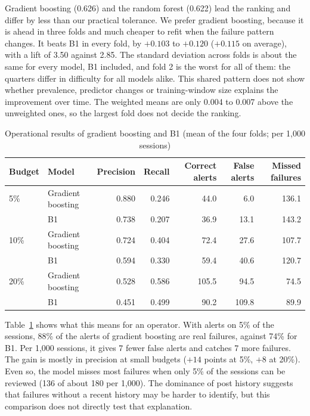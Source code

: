 \documentclass[12pt,a4paper,openany]{report}
\begin{document}
Gradient boosting (0.626) and the random forest (0.622) lead the ranking and differ by less than our practical tolerance. We prefer gradient boosting, because it
is ahead in three folds and much cheaper to refit when the failure pattern changes. It beats B1 in every fold, by
$+0.103$ to $+0.120$ ($+0.115$ on average), with a lift of 3.50 against 2.85. The standard deviation across folds is
about the same for every model, B1 included, and fold 2 is the worst for all of them: the quarters differ in
difficulty for all models alike. This shared pattern does not show whether prevalence, predictor changes or
training-window size explains the improvement over time. The weighted means are only 0.004 to 0.007 above the unweighted ones, so the
largest fold does not decide the ranking.

\begin{table}[!htb]
  \centering\small
  \caption{Operational results of gradient boosting and B1 (mean of the four folds; per 1,000 sessions)}
  \label{tab:alerts}
  \setlength{\tabcolsep}{4pt}
  \begin{tabular*}{\textwidth}{@{\extracolsep{\fill}}llrrrrr}
    \toprule
    Budget & Model & Precision & Recall & Correct alerts & False alerts & Missed failures \\
    \midrule
    5\%  & Gradient boosting & 0.880 & 0.246 & 44.0  & 6.0  & 136.1 \\
         & B1                & 0.738 & 0.207 & 36.9  & 13.1 & 143.2 \\
    10\% & Gradient boosting & 0.724 & 0.404 & 72.4  & 27.6 & 107.7 \\
         & B1                & 0.594 & 0.330 & 59.4  & 40.6 & 120.7 \\
    20\% & Gradient boosting & 0.528 & 0.586 & 105.5 & 94.5 & 74.5 \\
         & B1                & 0.451 & 0.499 & 90.2  & 109.8 & 89.9 \\
    \bottomrule
  \end{tabular*}
\end{table}

Table~\ref{tab:alerts} shows what this means for an operator. With alerts on 5\% of the sessions, 88\% of the
alerts of gradient boosting are real failures, against 74\% for B1. Per 1,000 sessions, it gives 7 fewer false
alerts and catches 7 more failures. The gain is mostly in precision at small budgets ($+14$ points at 5\%, $+8$ at
20\%). Even so, the model misses most failures when only 5\% of the sessions can be reviewed (136 of about 180 per
1,000). The dominance of post history suggests that failures without a recent history may be harder to identify,
but this comparison does not directly test that explanation.
\end{document}
